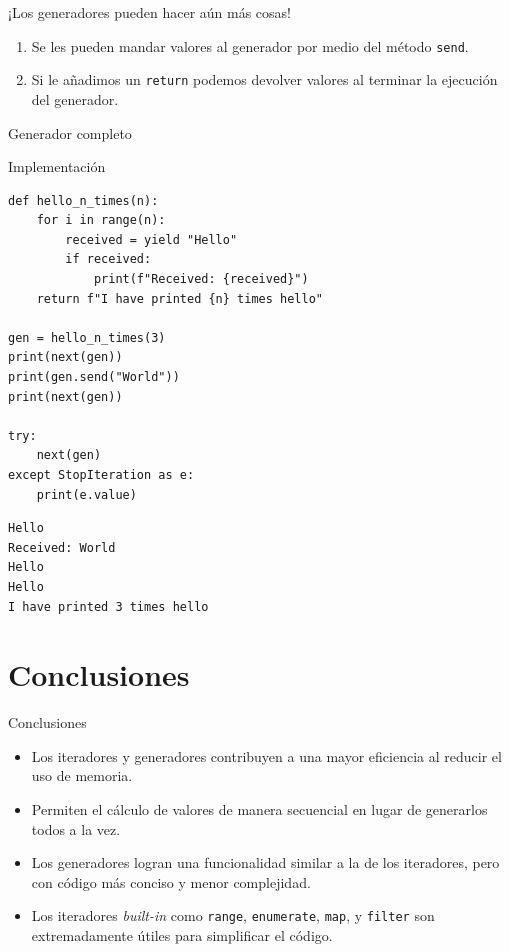 \documentclass[11pt]{beamer}
\begin{document}
\begin{frame}{¡Los generadores pueden hacer aún más cosas!}
    \begin{enumerate}
        \item Se les pueden mandar valores al generador por medio del método \texttt{send}.
        \item Si le añadimos un \texttt{return} podemos devolver valores al terminar la ejecución del generador.
    \end{enumerate}
\end{frame}

\begin{frame}[fragile]{Generador completo}
\begin{block}{Implementación}
\begin{verbatim}
def hello_n_times(n):
    for i in range(n):
        received = yield "Hello"
        if received: 
            print(f"Received: {received}")
    return f"I have printed {n} times hello"

gen = hello_n_times(3)
print(next(gen))
print(gen.send("World")) 
print(next(gen))  

try:
    next(gen)
except StopIteration as e:
    print(e.value)
\end{verbatim}
\begin{verbatim}
Hello
Received: World
Hello
Hello
I have printed 3 times hello 
\end{verbatim}
\end{block}
\end{frame}

\section{Conclusiones}

\begin{frame}{Conclusiones}
    \begin{itemize}
        \item Los iteradores y generadores contribuyen a una mayor eficiencia al reducir el uso de memoria.
        \item Permiten el cálculo de valores de manera secuencial en lugar de generarlos todos a la vez.
        \item Los generadores logran una funcionalidad similar a la de los iteradores, pero con código más conciso y menor complejidad.
        \item Los iteradores \textit{built-in} como \texttt{range}, \texttt{enumerate}, \texttt{map}, y \texttt{filter} son extremadamente útiles para simplificar el código.
    \end{itemize}
\end{frame}
\end{document}
